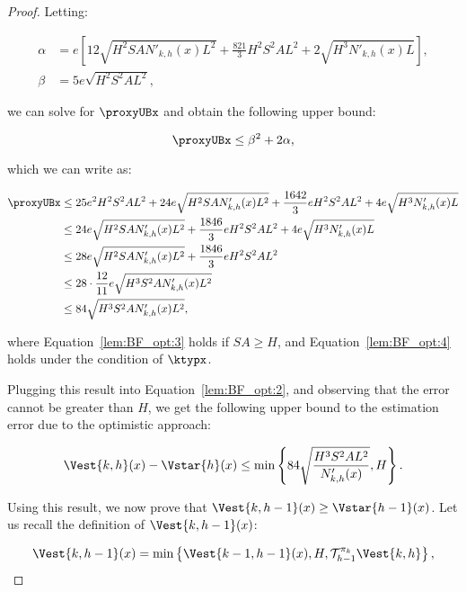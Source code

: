 \begin{proof}
Letting:

\begin{align*}
    \alpha &= e \left[ 12 \sqrt{H^2 S A N'_{k,h}(x) L^2} + \frac{821}{3} H^2 S^2 A L^2 + 2 \sqrt{H^3 N'_{k,h}(x) L}\right], \\
    \beta &= 5e\sqrt{H^2 S^2 A L^2},
\end{align*}

we can solve for $\proxyUBx$ and obtain the following upper bound:

\begin{equation*}
    \proxyUBx \le \beta^2 + 2\alpha,
\end{equation*}

which we can write as:

\begin{align}
    \proxyUBx &\le 25 e^2 H^2 S^2 A L^2 + 24 e \sqrt{H^2 S A N'_{k,h}(x) L^2} + \frac{1642}{3} e H^2 S^2 A L^2 + 4 e \sqrt{H^3 N'_{k,h}(x) L} \nonumber \\
    &\le 24 e \sqrt{H^2 S A N'_{k,h}(x) L^2} + \frac{1846}{3} e H^2 S^2 A L^2 + 4 e \sqrt{H^3 N'_{k,h}(x) L} \nonumber \\
    &\le 28 e \sqrt{H^2 S A N'_{k,h}(x) L^2} + \frac{1846}{3} e H^2 S^2 A L^2 \label{lem:BF_opt:3} \\
    &\le 28 \cdot \frac{12}{11} e \sqrt{H^3 S^2 A N'_{k,h}(x) L^2} \label{lem:BF_opt:4} \\
    &\le 84 \sqrt{H^3 S^2 A N'_{k,h}(x) L^2}, \nonumber
\end{align}

where Equation~\eqref{lem:BF_opt:3} holds if $SA \ge H$, and Equation~\eqref{lem:BF_opt:4} holds under the condition of $\ktypx$.

Plugging this result into Equation~\eqref{lem:BF_opt:2}, and observing that the error cannot be greater than $H$, we get the following upper bound to the estimation error due to the optimistic approach:

\begin{equation}
\label{lem:BF_opt:5}
    \Vest{k,h}(x) - \Vstar{h}(x) \le \min \left\{ 84 \sqrt{\frac{H^3 S^2 A L^2}{N'_{k,h}(x)}}, H \right\}.
\end{equation}

Using this result, we now prove that $\Vest{k,h-1}(x) \ge \Vstar{h-1}(x)$. Let us recall the definition of $\Vest{k,h-1}(x)$:

\begin{equation*}
    \Vest{k,h-1}(x) = \min \left\{ \Vest{k-1, h-1}(x), H, \mathcal{T}_{h-1}^{\pi_k} \Vest{k,h} \right\},
\end{equation*}


\end{proof}

